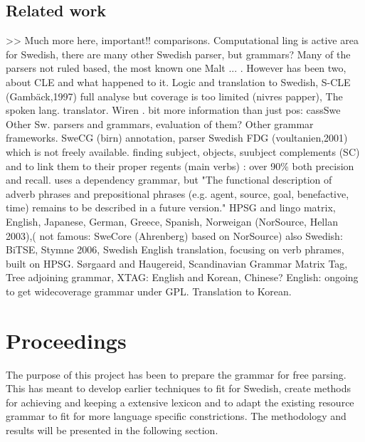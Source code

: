 \documentclass{report}
\begin{document}
\section{Related work}
>> Much more here, important!! comparisons.
Computational ling is active area for Swedish, there are many other Swedish parser,
but grammars?
Many of the parsers not ruled based, the most known one Malt\cite{malt} ... .
However has been two, about CLE\cite{cle} and what happened to it. Logic and translation
to Swedish, S-CLE (Gambäck,1997) full analyse but coverage is too limited (nivres papper), The
spoken lang. translator\cite{cle2}. Wiren \cite{wiren}. bit more information than
just pos: cassSwe \cite{casswe}
Other Sw. parsers and grammars, evaluation of them? 
Other grammar frameworks.
SweCG (birn) annotation, parser Swedish FDG (voultanien,2001) which is not freely available.
finding subject, objects, suubject complements (SC) and
to link them to their proper regents (main verbs) : over 90\% both precision and recall.
uses a dependency grammar, but "The functional description of adverb phrases
and prepositional phrases (e.g. agent, source, goal, benefactive, time) remains
to be described in a future version." 
HPSG\cite{hpsg} and lingo matrix\cite{lingomatrix}, English, Japanese, German,
Greece, Spanish, Norweigan (NorSource, Hellan 2003),( not famous: SweCore
(Ahrenberg) based on NorSource)
also Swedish: BiTSE\cite{stymne}, Stymne 2006, Swedish English translation,
focusing on verb phrames, built on HPSG.
S\o rgaard and Haugereid, Scandinavian Grammar Matrix\cite{scandmatrix}
Tag, Tree adjoining grammar, XTAG: English and Korean, Chinese? English: ongoing to get widecoverage grammar
under GPL. Translation to Korean.

\chapter{Proceedings}
The purpose of this project has been to prepare the grammar for free parsing.
This has meant to develop earlier techniques to fit for Swedish, create methods
for achieving and keeping a extensive lexicon and to adapt the existing
resource grammar to fit for more language specific constrictions.
The methodology and results will be presented in the following section.
\end{document}
